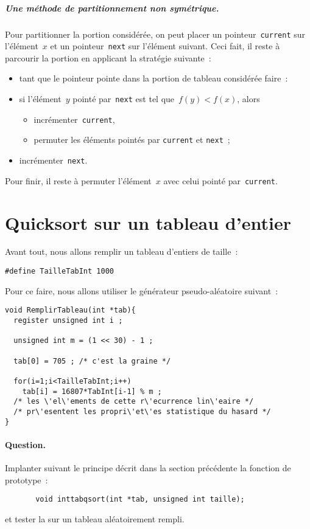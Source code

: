 \documentclass{article}
\begin{document}
\subparagraph{Une m\'ethode de partitionnement non sym\'etrique.}  

Pour partitionner la portion consid\'er\'ee, on peut placer un
pointeur~\texttt{current} sur l'\'el\'ement~$x$ et un
pointeur~\texttt{next} sur l'\'el\'ement suivant. Ceci fait, il reste
\`a parcourir la portion en applicant la strat\'egie suivante~:
\begin{itemize}
\item[] tant que le pointeur pointe dans la portion de tableau consid\'er\'ee faire~:
\item si l'\'el\'ement~$y$ point\'e par~\texttt{next} est tel
  que~${f(y)< f(x)}$, alors 
  \begin{itemize}
  \item incr\'ementer~\texttt{current},
  \item permuter les \'el\'ements point\'es par \texttt{current} et
    \texttt{next}~;
  \end{itemize}
\item incr\'ementer~\texttt{next}.
\end{itemize}
Pour finir, il reste \`a permuter l'\'el\'ement~$x$ avec celui point\'e par~\texttt{current}.

\section{Quicksort sur un tableau d'entier}
Avant tout, nous allons remplir un tableau d'entiers de taille~:
\begin{verbatim}
#define TailleTabInt 1000
\end{verbatim}
Pour ce faire, nous allons utiliser le g\'en\'erateur pseudo-al\'eatoire suivant~:
\begin{verbatim}
void RemplirTableau(int *tab){
  register unsigned int i ;

  unsigned int m = (1 << 30) - 1 ; 

  tab[0] = 705 ; /* c'est la graine */

  for(i=1;i<TailleTabInt;i++)       
    tab[i] = 16807*TabInt[i-1] % m ; 
  /* les \'el\'ements de cette r\'ecurrence lin\'eaire */
  /* pr\'esentent les propri\'et\'es statistique du hasard */
}
\end{verbatim}
\paragraph{Question.}
Implanter suivant le principe d\'ecrit dans la section pr\'ec\'edente
la fonction de prototype~:
\begin{verbatim}
       void inttabqsort(int *tab, unsigned int taille);
\end{verbatim}
et tester la sur un tableau al\'eatoirement rempli.
\end{document}
